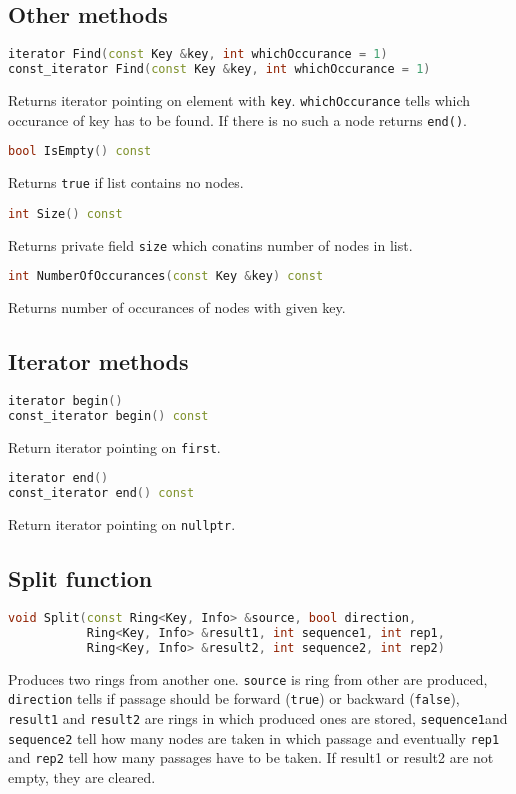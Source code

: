 \documentclass{article}
\begin{document}
\subsection{Other methods}

\begin{lstlisting}[language=C++]
iterator Find(const Key &key, int whichOccurance = 1)
const_iterator Find(const Key &key, int whichOccurance = 1)
\end{lstlisting}
Returns iterator pointing on element with {\tt key}. {\tt whichOccurance}
tells which occurance of key has to be found. If there is no such a node returns {\tt end()}.

\begin{lstlisting}[language=C++]
bool IsEmpty() const
\end{lstlisting}
Returns {\tt true} if list contains no nodes.

\begin{lstlisting}[language=C++]
int Size() const
\end{lstlisting}
Returns private field {\tt size} which conatins number of nodes in list.

\begin{lstlisting}[language=C++]
int NumberOfOccurances(const Key &key) const
\end{lstlisting}
Returns number of occurances of nodes with given key.
\vspace{\baselineskip}

\subsection{Iterator methods}

\begin{lstlisting}[language=C++]
iterator begin()
const_iterator begin() const
\end{lstlisting}
Return iterator pointing on {\tt first}.

\begin{lstlisting}[language=C++]
iterator end()
const_iterator end() const
\end{lstlisting}
Return iterator pointing on {\tt nullptr}.
\vspace{\baselineskip}

\subsection{Split function}

\begin{lstlisting}[language=C++]
void Split(const Ring<Key, Info> &source, bool direction,
           Ring<Key, Info> &result1, int sequence1, int rep1,
           Ring<Key, Info> &result2, int sequence2, int rep2)
\end{lstlisting}
Produces two rings from another one. {\tt source} is ring from other are produced, 
{\tt direction} tells if passage should be forward ({\tt true}) or backward ({\tt false}),
{\tt result1} and {\tt result2} are rings in which produced ones are stored,
{\tt sequence1}and {\tt sequence2} tell how many nodes are taken in which passage
and eventually {\tt rep1} and {\tt rep2} tell how many passages have to be taken.
If result1 or result2 are not empty, they are cleared.
\newpage
\end{document}
